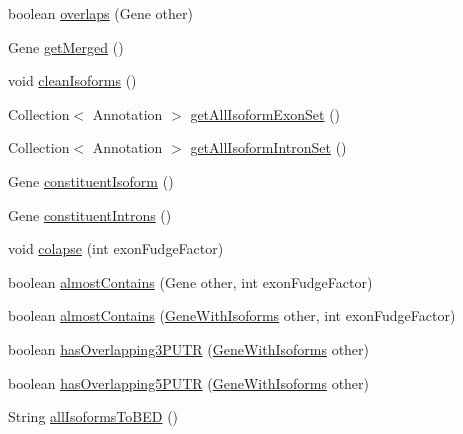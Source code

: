 \begin{DoxyCompactItemize}
\item 
boolean \hyperlink{classbroad_1_1pda_1_1gene_1_1_gene_with_isoforms_ac9df70f06dab1c1539f463cbd178707c}{overlaps} (Gene other)
\item 
Gene \hyperlink{classbroad_1_1pda_1_1gene_1_1_gene_with_isoforms_aceaafb564ece7b46650aac895a433a30}{get\+Merged} ()
\item 
void \hyperlink{classbroad_1_1pda_1_1gene_1_1_gene_with_isoforms_a88948fa8b40ad89c03b68290d7680e89}{clean\+Isoforms} ()
\item 
Collection$<$ Annotation $>$ \hyperlink{classbroad_1_1pda_1_1gene_1_1_gene_with_isoforms_a10f9995cb3f615e7f85924ed2804773e}{get\+All\+Isoform\+Exon\+Set} ()
\item 
Collection$<$ Annotation $>$ \hyperlink{classbroad_1_1pda_1_1gene_1_1_gene_with_isoforms_a05c8b5e950abd2bc006a016d34074a55}{get\+All\+Isoform\+Intron\+Set} ()
\item 
Gene \hyperlink{classbroad_1_1pda_1_1gene_1_1_gene_with_isoforms_a7458b9e87f5562becd888d0c50f378f4}{constituent\+Isoform} ()
\item 
Gene \hyperlink{classbroad_1_1pda_1_1gene_1_1_gene_with_isoforms_a0edc29c33ccb0bd3514f8ad36230f15f}{constituent\+Introns} ()
\item 
void \hyperlink{classbroad_1_1pda_1_1gene_1_1_gene_with_isoforms_a05c201b75ab2113fb78c65b986dbce5a}{colapse} (int exon\+Fudge\+Factor)
\item 
boolean \hyperlink{classbroad_1_1pda_1_1gene_1_1_gene_with_isoforms_a1f6e14b0fa2c0db562a964dfa5f0f5cf}{almost\+Contains} (Gene other, int exon\+Fudge\+Factor)
\item 
boolean \hyperlink{classbroad_1_1pda_1_1gene_1_1_gene_with_isoforms_a1f92c06c5ff48d7d97e78c174208cbb3}{almost\+Contains} (\hyperlink{classbroad_1_1pda_1_1gene_1_1_gene_with_isoforms}{Gene\+With\+Isoforms} other, int exon\+Fudge\+Factor)
\item 
boolean \hyperlink{classbroad_1_1pda_1_1gene_1_1_gene_with_isoforms_ab183c69df7400589473c96b7442cf979}{has\+Overlapping3\+P\+U\+T\+R} (\hyperlink{classbroad_1_1pda_1_1gene_1_1_gene_with_isoforms}{Gene\+With\+Isoforms} other)
\item 
boolean \hyperlink{classbroad_1_1pda_1_1gene_1_1_gene_with_isoforms_ac117a43564794ae141dc09e814485031}{has\+Overlapping5\+P\+U\+T\+R} (\hyperlink{classbroad_1_1pda_1_1gene_1_1_gene_with_isoforms}{Gene\+With\+Isoforms} other)
\item 
String \hyperlink{classbroad_1_1pda_1_1gene_1_1_gene_with_isoforms_a81da8ee765fed74194cb8e9b4eab1a70}{all\+Isoforms\+To\+B\+E\+D} ()

\end{DoxyCompactItemize}
